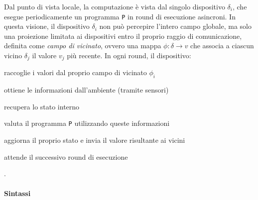 Dal punto di vista locale, la computazione è vista dal singolo dispositivo \(\delta_i\), che esegue periodicamente un programma \texttt{P} in round di esecuzione asincroni.
%
In questa visione, il dispositivo \(\delta_i\) non può percepire l'intero campo globale, ma solo una proiezione limitata ai dispositivi entro il proprio raggio di comunicazione, definita come \textit{campo di vicinato}, ovvero una mappa \(\phi: \delta \to v\) che associa a ciascun vicino \(\delta_j\) il valore \(v_j\) più recente.
%
In ogni round, il dispositivo: 
\begin{enumerate*}[label=\roman*), itemjoin={{; }}, itemjoin*={{; }}]
    \item raccoglie i valori dal proprio campo di vicinato \(\phi_i\)
    \item ottiene le informazioni dall'ambiente (tramite sensori)
    \item recupera lo stato interno
    \item valuta il programma \texttt{P} utilizzando queste informazioni
    \item aggiorna il proprio stato e invia il valore risultante ai vicini
    \item attende il successivo round di esecuzione
\end{enumerate*} \cite{HFC}.

\paragraph{Sintassi}

